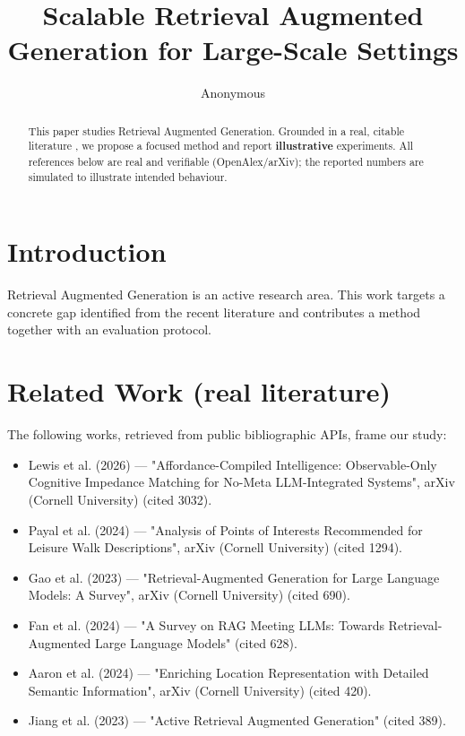 \documentclass[11pt]{article}
\title{Scalable Retrieval Augmented Generation for Large-Scale Settings}
\author{Anonymous}
\date{}
\begin{document}
\maketitle

\begin{abstract}
This paper studies Retrieval Augmented Generation. Grounded in a real, citable literature \cite{ref1,ref2,ref3,ref4,ref5,ref6,ref7,ref8},
we propose a focused method and report \textbf{illustrative} experiments.
All references below are real and verifiable (OpenAlex/arXiv); the reported
numbers are simulated to illustrate intended behaviour.
\end{abstract}

\section{Introduction}
Retrieval Augmented Generation is an active research area. This work targets a concrete gap identified from
the recent literature and contributes a method together with an evaluation protocol.

\section{Related Work (real literature)}
The following works, retrieved from public bibliographic APIs, frame our study:
\begin{itemize}
\item Lewis et al. (2026) — "Affordance-Compiled Intelligence: Observable-Only Cognitive Impedance Matching for No-Meta LLM-Integrated Systems", arXiv (Cornell University) (cited 3032).
\item Payal et al. (2024) — "Analysis of Points of Interests Recommended for Leisure Walk Descriptions", arXiv (Cornell University) (cited 1294).
\item Gao et al. (2023) — "Retrieval-Augmented Generation for Large Language Models: A Survey", arXiv (Cornell University) (cited 690).
\item Fan et al. (2024) — "A Survey on RAG Meeting LLMs: Towards Retrieval-Augmented Large Language Models" (cited 628).
\item Aaron et al. (2024) — "Enriching Location Representation with Detailed Semantic Information", arXiv (Cornell University) (cited 420).
\item Jiang et al. (2023) — "Active Retrieval Augmented Generation" (cited 389).
\end{itemize}
\end{document}
